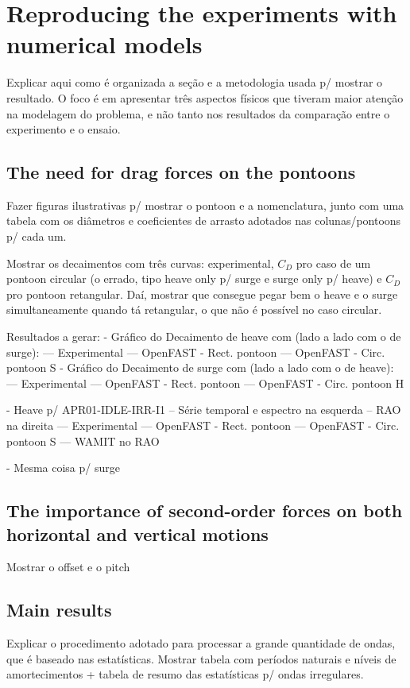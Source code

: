 \section{Reproducing the experiments with numerical models} \label{sec:exp_vs_num}
Explicar aqui como é organizada a seção e a metodologia usada p/ mostrar o resultado. O foco é em apresentar três aspectos físicos que tiveram maior atenção na modelagem do problema, e não tanto nos resultados da comparação entre o experimento e o ensaio.


\subsection{The need for drag forces on the pontoons}
Fazer figuras ilustrativas p/ mostrar o pontoon e a nomenclatura, junto com uma tabela com os diâmetros e coeficientes de arrasto adotados nas colunas/pontoons p/ cada um.

Mostrar os decaimentos com três curvas: experimental, $C_D$ pro caso de um pontoon circular (o errado, tipo heave only p/ surge e surge only p/ heave) e $C_D$ pro pontoon retangular. Daí, mostrar que consegue pegar bem o heave e o surge simultaneamente quando tá retangular, o que não é possível no caso circular.


Resultados a gerar:
- Gráfico do Decaimento de heave com (lado a lado com o de surge):
--- Experimental
--- OpenFAST - Rect. pontoon
--- OpenFAST - Circ. pontoon S 
- Gráfico do Decaimento de surge com (lado a lado com o de heave):
--- Experimental
--- OpenFAST - Rect. pontoon
--- OpenFAST - Circ. pontoon H 

- Heave p/ APR01-IDLE-IRR-I1
-- Série temporal e espectro na esquerda
-- RAO na direita
--- Experimental
--- OpenFAST - Rect. pontoon
--- OpenFAST - Circ. pontoon S 
--- WAMIT no RAO

- Mesma coisa p/ surge


\subsection{The importance of second-order forces on both horizontal and vertical motions}
Mostrar o offset e o pitch

\subsection{Main results}
Explicar o procedimento adotado para processar a grande quantidade de ondas, que é baseado nas estatísticas.
Mostrar tabela com períodos naturais e níveis de amortecimentos + tabela de resumo das estatísticas p/ ondas irregulares.

